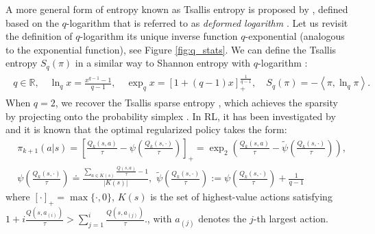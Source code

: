 \documentclass{article}
\newcommand{\AdaBracket}[1]{\left(#1\right)}
\newcommand{\AdaRectBracket}[1]{\left[#1\right]}
\newcommand{\AdaAngleProduct}[2]{\left\langle#1, #2\right\rangle}
\newcommand{\qlog}{$q$-logarithm }
\newcommand{\tsallis}[1]{S_q(#1)}
\newcommand{\logq}[1]{\ln_{q}\!#1}
\newcommand{\expq}[1]{\exp_{q}\!#1}
\begin{document}
A more general form of entropy known as Tsallis entropy is proposed by \cite{TsallisEntropy},  defined based on the \qlog that is referred to as \emph{deformed logarithm} \cite{tsallis2009introduction}.
Let us revisit the definition of \qlog its unique inverse function $q$-exponential (analogous to the exponential function), see Figure \ref{fig:q_stats}.
We can define the Tsallis entropy $S_q(\pi)$ in a similar way to Shannon entropy with \qlog:
\begin{align}
    \begin{split}
        q \in  \mathbb{R}, \quad \logq{x} = \frac{x^{q-1} - 1}{q-1}, \quad \expq{x} = \AdaRectBracket{1 + (q - 1)x}^{\frac{1}{q-1}}_{+},\quad \tsallis{\pi} = -\AdaAngleProduct{\pi}{\logq{\pi}}.
    \end{split}
\end{align}
When $q=2$, we recover the Tsallis sparse entropy \cite{Martins16-sparsemax}, which achieves the sparsity by projecting onto the probability simplex \cite{Blondel-2020LearningFenchelYoundLoss}.
In RL, it has been investigated by \cite{Lee2018-TsallisRAL,Lee2020-generalTsallisRSS} and it is known that the optimal regularized policy takes the form:
\begin{align*}
    &\pi_{k+1}(a|s) = \AdaRectBracket{\frac{Q_k(s,a)}{\tau} - \psi\AdaBracket{\frac{Q_k(s, \cdot)}{\tau}}}_{+} = \exp_2 \AdaBracket{\frac{Q_k(s,a)}{\tau } - \tilde{\psi}\AdaBracket{\frac{Q_k(s, \cdot)}{\tau }}}, \\
    &{\psi}\AdaBracket{\frac{Q_{k}(s,\cdot)}{\tau}} \doteq \frac{\sum_{a\in K(s)} \frac{Q(s,a)}{\tau} - 1 }{|K{(s)}|}, \,\, \tilde{\psi}\AdaBracket{\frac{Q_{k}(s,\cdot)}{\tau}} := \psi\AdaBracket{\frac{Q_{k}(s,\cdot)}{\tau}} + \frac{1}{q-1}
\end{align*}
where $[\cdot]_{+} = \max \{\cdot, 0\}$,  $K(s)$ is the set of highest-value actions satisfying $1 \!+\! i\frac{Q(s,a_{(i)})}{\tau} \!>\! \sum_{j=1}^{i}\frac{Q(s,a_{(j)})}{\tau}$., with $a_{(j)}$ denotes the $j$-th largest action.


\end{document}
